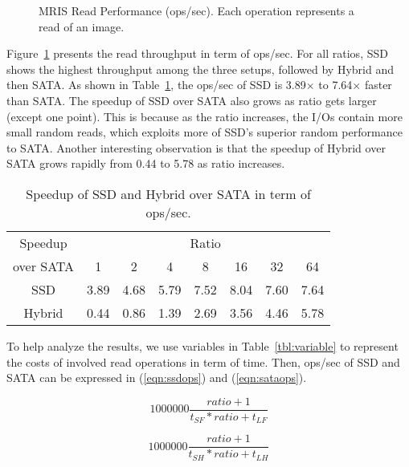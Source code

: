 \begin{figure}[t]
\begin{centering}
\caption{MRIS Read Performance (ops/sec). Each operation represents a
read of an image.}
\label{fig:mrisopssec}
\end{centering}
\end{figure}

Figure~\ref{fig:mrisopssec} presents the read throughput in term of
ops/sec. For all ratios, SSD shows the highest throughput among the
three setups, followed by Hybrid and then SATA. As shown in
Table~\ref{tbl:speedup}, the ops/sec of SSD is 3.89$\times$ to
7.64$\times$ faster than SATA. The speedup of SSD over SATA also grows
as ratio gets larger (except one point). This is because as the ratio
increases, the I/Os contain more small random reads, which exploits
more of SSD's superior random performance to SATA. Another interesting
observation is that the speedup of Hybrid over SATA grows rapidly from
0.44 to 5.78 as ratio increases.

\begin{table}[tc]
{\centering \footnotesize
\begin{tabular}{c|c|c|c|c|c|c|c}
\hline 
  Speedup & \multicolumn{7}{c}{Ratio} \\ \cline{2-8}
  over SATA & 1 & 2 & 4 & 8 & 16 & 32 & 64 \\ \hline
  SSD & 3.89 & 4.68 & 5.79 & 7.52 & 8.04 & 7.60 & 7.64  \\
  Hybrid & 0.44 & 0.86 & 1.39 & 2.69 & 3.56 & 4.46 & 5.78 \\ \hline
\end{tabular}
 \caption{Speedup of SSD and Hybrid over SATA in term of ops/sec.}
\label{tbl:speedup}
}
\end{table}

To help analyze the results, we use variables in
Table~\ref{tbl:variable} to represent the costs of involved read
operations in term of time. Then, ops/sec of SSD and SATA can be
expressed in (\ref{eqn:ssdops}) and (\ref{eqn:sataops}). 

\begin{equation}
\label{eqn:ssdops}
    1000000 \frac{ratio + 1}{t_{SF} * ratio + t_{LF}}
\end{equation}

\begin{equation}
\label{eqn:sataops}
    1000000 \frac{ratio + 1}{t_{SH} * ratio + t_{LH}}
\end{equation}

